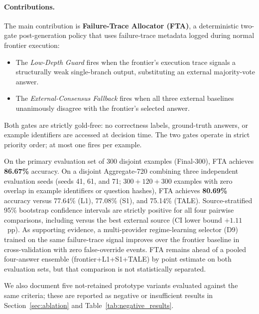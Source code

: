 \documentclass[smallcondensed]{svjour3}
\begin{document}
\paragraph{Contributions.}
The main contribution is \textbf{Failure-Trace Allocator (FTA)}, a deterministic
two-gate post-generation policy that uses failure-trace metadata logged during normal
frontier execution:
\begin{itemize}[leftmargin=1.4em,itemsep=2pt]
  \item The \textit{Low-Depth Guard} fires when the frontier's execution trace signals
        a structurally weak single-branch output, substituting an external majority-vote
        answer.
  \item The \textit{External-Consensus Fallback} fires when all three external baselines
        unanimously disagree with the frontier's selected answer.
\end{itemize}
Both gates are strictly gold-free: no correctness labels, ground-truth answers, or
example identifiers are accessed at decision time.
The two gates operate in strict priority order; at most one fires per example.

On the primary evaluation set of 300 disjoint examples (Final-300), FTA achieves
\textbf{86.67\%} accuracy.
On a disjoint Aggregate-720 combining three independent evaluation seeds (seeds 41,
61, and 71; $300 + 120 + 300$ examples with zero overlap in example identifiers or
question hashes), FTA achieves \textbf{80.69\%} accuracy versus 77.64\% (L1),
77.08\% (S1), and 75.14\% (TALE).
Source-stratified 95\% bootstrap confidence intervals are strictly positive for all
four pairwise comparisons, including versus the best external source
(CI lower bound $+1.11$~pp).
As supporting evidence, a multi-provider regime-learning selector (D9) trained on the
same failure-trace signal improves over the frontier baseline in cross-validation with zero
false-override events.
FTA remains ahead of a pooled four-answer ensemble (frontier+L1+S1+TALE) by point
estimate on both evaluation sets, but that comparison is not statistically separated.

We also document five not-retained prototype variants evaluated against the same
criteria; these are reported as negative or insufficient results in
Section~\ref{sec:ablation} and Table~\ref{tab:negative_results}.
\end{document}
